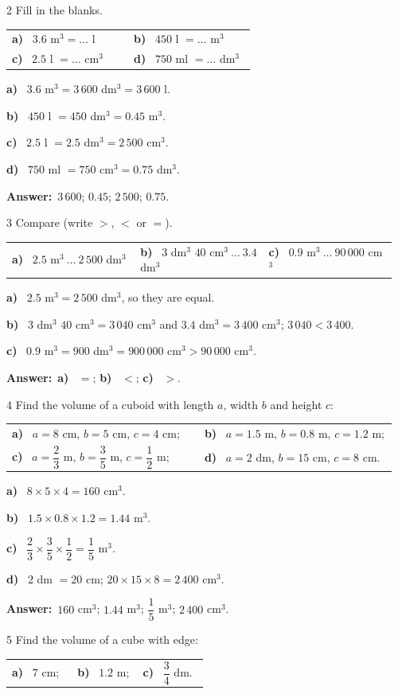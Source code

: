 \documentclass[11pt]{article}
\makeatletter
\newif\ifsol \solfalse
\renewcommand{\arraystretch}{1.35}
\providecommand{\AnsWord}{Đáp số}
\newcommand{\dapso}[1]{\par\textbf{\AnsWord:}\ #1}
\newcommand{\probsol}[1]{%
  \begin{lrbox}{\solmeasure}\begin{minipage}{\dimexpr\linewidth-24pt\relax}#1\end{minipage}\end{lrbox}%
  \ifsol
    \begin{solbox}#1\end{solbox}%
  \else
    \setlength{\solht}{\dimexpr\ht\solmeasure+\dp\solmeasure+0.85cm\relax}%
    \ifdim\solht<1.35cm\setlength{\solht}{1.35cm}\fi
    \begin{tcolorbox}[colback=white,colframe=Line,boxrule=0.8pt,arc=5pt,
      left=8pt,right=8pt,top=4pt,bottom=4pt,height=\solht]{\footnotesize\color{Slate}\itshape\WorkWord}\end{tcolorbox}%
  \fi}
\newcommand{\pa}[1]{\textbf{#1)}\ }
\newenvironment{cols2}{\par\vspace{3pt}\noindent\setlength{\tabcolsep}{0pt}\renewcommand{\arraystretch}{1.3}%
  \begin{tabular}{@{}>{\raggedright\arraybackslash\rule{0pt}{4.4ex}}p{0.48\linewidth}<{\rule[-2.3ex]{0pt}{0pt}}@{\hspace{0.03\linewidth}}>{\raggedright\arraybackslash\rule{0pt}{4.4ex}}p{0.48\linewidth}<{\rule[-2.3ex]{0pt}{0pt}}@{}}}%
  {\end{tabular}\par}
\newenvironment{cols3}{\par\vspace{3pt}\noindent\setlength{\tabcolsep}{0pt}\renewcommand{\arraystretch}{1.3}%
  \begin{tabular}{@{}>{\raggedright\arraybackslash\rule{0pt}{4.4ex}}p{0.32\linewidth}<{\rule[-2.3ex]{0pt}{0pt}}@{\hspace{0.015\linewidth}}>{\raggedright\arraybackslash\rule{0pt}{4.4ex}}p{0.32\linewidth}<{\rule[-2.3ex]{0pt}{0pt}}@{\hspace{0.015\linewidth}}>{\raggedright\arraybackslash\rule{0pt}{4.4ex}}p{0.32\linewidth}<{\rule[-2.3ex]{0pt}{0pt}}@{}}}%
  {\end{tabular}\par}
\newcommand{\gap}{\vspace{0.3cm}}
\def\WorkWord{Your work:}
\def\AnsWord{Answer}
\makeatother
\begin{document}
\gap
\begin{probbox}{2}{\relax}
Fill in the blanks.
\begin{cols2}
\pa{a} $3.6$ m$^3=\ldots$ l & \pa{b} $450$ l $=\ldots$ m$^3$\\
\pa{c} $2.5$ l $=\ldots$ cm$^3$ & \pa{d} $750$ ml $=\ldots$ dm$^3$
\end{cols2}
\end{probbox}
\probsol{
\pa{a} $3.6$ m$^3=3\,600$ dm$^3=3\,600$ l.\par
\pa{b} $450$ l $=450$ dm$^3=0.45$ m$^3$.\par
\pa{c} $2.5$ l $=2.5$ dm$^3=2\,500$ cm$^3$.\par
\pa{d} $750$ ml $=750$ cm$^3=0.75$ dm$^3$.
\dapso{$3\,600$; $0.45$; $2\,500$; $0.75$.}}
\gap
\begin{probbox}{3}{\relax}
Compare (write $>$, $<$ or $=$).
\begin{cols3}
\pa{a} $2.5$ m$^3\ \ldots\ 2\,500$ dm$^3$ & \pa{b} $3$ dm$^3$ $40$ cm$^3\ \ldots\ 3.4$ dm$^3$ & \pa{c} $0.9$ m$^3\ \ldots\ 90\,000$ cm$^3$
\end{cols3}
\end{probbox}
\probsol{
\pa{a} $2.5$ m$^3=2\,500$ dm$^3$, so they are equal.\par
\pa{b} $3$ dm$^3$ $40$ cm$^3=3\,040$ cm$^3$ and $3.4$ dm$^3=3\,400$ cm$^3$; $3\,040<3\,400$.\par
\pa{c} $0.9$ m$^3=900$ dm$^3=900\,000$ cm$^3>90\,000$ cm$^3$.
\dapso{\pa{a} $=$; \pa{b} $<$; \pa{c} $>$.}}
\gap
\begin{probbox}{4}{\relax}
Find the volume of a cuboid with length $a$, width $b$ and height $c$:
\begin{cols2}
\pa{a} $a=8$ cm, $b=5$ cm, $c=4$ cm; & \pa{b} $a=1.5$ m, $b=0.8$ m, $c=1.2$ m;\\
\pa{c} $a=\dfrac23$ m, $b=\dfrac35$ m, $c=\dfrac12$ m; & \pa{d} $a=2$ dm, $b=15$ cm, $c=8$ cm.
\end{cols2}
\end{probbox}
\probsol{
\pa{a} $8\times5\times4=160$ cm$^3$.\par
\pa{b} $1.5\times0.8\times1.2=1.44$ m$^3$.\par
\pa{c} $\dfrac23\times\dfrac35\times\dfrac12=\dfrac15$ m$^3$.\par
\pa{d} $2$ dm $=20$ cm; $20\times15\times8=2\,400$ cm$^3$.
\dapso{$160$ cm$^3$; $1.44$ m$^3$; $\dfrac15$ m$^3$; $2\,400$ cm$^3$.}}
\gap
\begin{probbox}{5}{\relax}
Find the volume of a cube with edge:
\begin{cols3}
\pa{a} $7$ cm; & \pa{b} $1.2$ m; & \pa{c} $\dfrac34$ dm.
\end{cols3}
\end{probbox}
\end{document}
